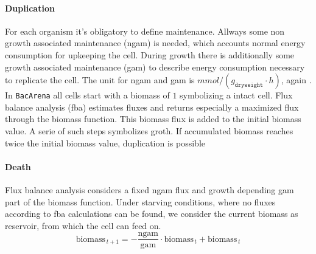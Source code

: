 \paragraph{Duplication}
For each organism it's obligatory to define maintenance.
Allways some non growth associated maintenance (ngam) is needed, which accounts normal energy consumption for upkeeping the cell.
During growth there is additionally some growth associated maintenance (gam) to describe energy consumption necessary to replicate the cell. The unit for ngam and gam is $mmol/(g_{\texttt{dryweight}}\cdot h)$, again \cite{Thiele2010}.\\
In \texttt{BacArena} all cells start with a biomass of $1$ symbolizing a intact cell.
Flux balance analysis (fba) estimates fluxes and returns especially a maximized flux through the biomass function.
This biomass flux is added to the initial biomass value. A serie of such steps symbolizes groth.
If accumulated biomass reaches twice the initial biomass value, duplication is possible
\paragraph{Death}
Flux balance analysis considers a fixed ngam flux and growth depending gam part of the biomass function.
Under starving conditions, where no fluxes according to fba calculations can be found, we consider the current biomass as reservoir, from which the cell can feed on.
\[
  \textrm{biomass}_{\,t+1} = -\frac{\textrm{ngam}}{\textrm{gam}}\cdot \textrm{biomass}_{\,t}+\textrm{biomass}_{\,t}
\]
